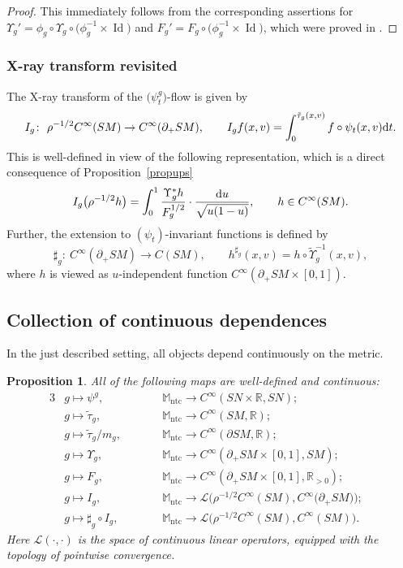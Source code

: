 \documentclass[pdftex]{sigma}
\numberwithin{equation}{section}
\newtheorem{Proposition}[Theorem]{Proposition}
\theoremstyle{definition}
\newcommand{\R}{\mathbb{R}} %
\newcommand{\M}{\mathbb{M}}
\newcommand{\1}{{\bf 1}}
\newcommand{\ntc}{\mathrm{ntc}}
\begin{document}
\begin{proof}
This immediately follows from the corresponding assertions for $\Upsilon_g'=\phi_g\circ \Upsilon_g\circ \bigl(\phi_g^{-1}\times \operatorname{Id}\bigr)$ and $F_g'=F_g\circ \bigl(\phi_g^{-1}\times \operatorname{Id}\bigr)$, which were proved in \cite{MNP20}.
\end{proof}

\subsubsection{X-ray transform revisited}
The X-ray transform of the $\bigl(\psi^g_t\bigr)$-flow is given by
\[
	I_g\colon\ \rho^{-1/2}C^\infty(SM)\rightarrow C^\infty(\partial_+SM),\qquad I_g f(x,v)=\int_0^{\tilde \tau_g(x,v)} f\circ \psi_t(x,v) {\rm d}t.
\]
This is well-defined in view of the following representation, which is a direct consequence of Proposition~\ref{propups}
\begin{equation}\label{igrep}
		I_g \bigl(\rho^{-1/2}h\bigr) = \int_0^1
		\frac{\Upsilon_g^*h}{F_g^{1/2}}\cdot \frac{{\rm d}u}{\sqrt{u(1-u)}},\qquad h\in C^\infty(SM).
\end{equation}
Further, the extension to $(\psi_t)$-invariant functions is defined by
\[
	\sharp_g\colon\ C^\infty(\partial_+SM)\rightarrow C(SM),\qquad h^{\sharp_g}(x,v) = h\circ \tilde \Upsilon_g^{-1}(x,v),
\]
where $h$ is viewed as $u$-independent function $C^\infty(\partial_+SM\times [0,1])$.


\subsection{Collection of continuous dependences}
In the just described setting, all objects depend continuously on the metric.
\begin{Proposition}\label{thm_continuitygalore}
	All of the following maps are well-defined and continuous:
	\begin{alignat}{3}
 & g\mapsto \psi^g, \qquad&& \M_\ntc\rightarrow C^\infty(SN\times \R,SN);& \tag{i}\\
& g\mapsto \tilde \tau_g, \qquad&& \M_\ntc\rightarrow C^\infty(SM,\R);& \tag{ii}\\
& g\mapsto \tilde \tau_g/m_g, \qquad&& \M_\ntc\rightarrow C^\infty(\partial SM,\R);&\tag{iii}\\
& g\mapsto \Upsilon_g, \qquad&& \M_\ntc\rightarrow C^\infty(\partial_+SM\times [0,1],SM);&\tag{iv}\\
& g \mapsto F_g, \qquad&& \M_\ntc\rightarrow C^\infty(\partial_+SM\times [0,1],\R_{>0});& \tag{v}\\
&g \mapsto I_g, \qquad&& \M_\ntc\rightarrow \mathcal L\bigl(\rho^{-1/2}C^\infty(SM),C^\infty({\partial_+SM)}\bigr);&\tag{vi}\\
& g\mapsto \sharp_g\circ I_g, \qquad&&  \M_\ntc\rightarrow \mathcal L\bigl(\rho^{-1/2}C^\infty(SM),C^\infty(SM)\bigr). & \tag{vii}
\end{alignat}		
Here $\mathcal L(\cdot,\cdot)$ is the space of continuous linear operators, equipped with the topology of pointwise convergence.
\end{Proposition}
\end{document}

